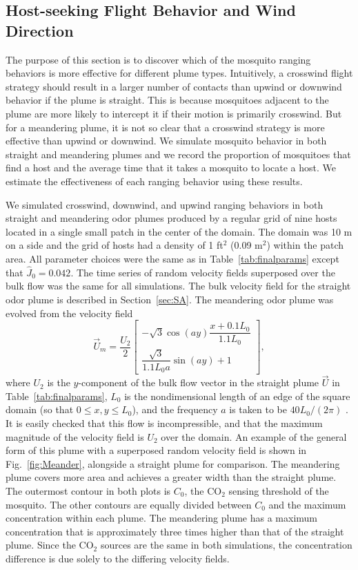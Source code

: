 \documentclass[12pt]{article}
\begin{document}
		\subsection{Host-seeking Flight Behavior and Wind Direction}\label{sec:res:meander}
			The purpose of this section is to discover which of the mosquito ranging behaviors is more effective for different plume types. Intuitively, a crosswind flight strategy should result in a larger number of contacts than upwind or downwind behavior if the plume is straight. This is because mosquitoes adjacent to the plume are more likely to intercept it if their motion is primarily crosswind. But for a meandering plume, it is not so clear that a crosswind strategy is more effective than upwind or downwind. We simulate mosquito behavior in both straight and meandering plumes and we record the proportion of mosquitoes that find a host and the average time that it takes a mosquito to locate a host. We estimate the effectiveness of each ranging behavior using these results.
			
			
			We simulated crosswind, downwind, and upwind ranging behaviors in both straight and meandering odor plumes produced by a regular grid of nine hosts located in a single small patch in the center of the domain. The domain was 10 m on a side and the grid of hosts had a density of 1 ft$^2$ (0.09 m$^2$) within the patch area.  All parameter choices were the same as in Table~\ref{tab:finalparams} except that $\hat{J}_0 = 0.042$. The time series of random velocity fields superposed over the bulk flow was the same for all simulations. The bulk velocity field for the straight odor plume is described in Section~\ref{sec:SA}. The meandering odor plume was evolved from the velocity field
			\begin{equation*}
				\vec{U}_m = \frac{U_2}{2}\begin{bmatrix} -\sqrt{3}\cos(ay)\dfrac{x+0.1L_0}{1.1L_0} \\
				 \dfrac{\sqrt{3}}{1.1L_0 a}\sin(ay)+1\end{bmatrix},
			\end{equation*}
			where $U_2$ is the $y$-component of the bulk flow vector in the straight plume $\vec{U}$ in Table~\ref{tab:finalparams}, $L_0$ is the nondimensional length of an edge of the square domain (so that $0\leq x,y \leq L_0$), and the frequency $a$ is taken to be $40L_0/(2\pi)$ . It is easily checked that this flow is incompressible, and that the maximum magnitude of the velocity field is $U_2$ over the domain. An example of the general form of this plume with a superposed random velocity field is shown in Fig.~\ref{fig:Meander}, alongside a straight plume for comparison. The meandering plume covers more area and achieves a greater width than the straight plume. The outermost contour in both plots is $C_0$, the CO$_2$ sensing threshold of the mosquito. The other contours are equally divided between $C_0$ and the maximum concentration within each plume. The meandering plume has a maximum concentration that is approximately three times higher than that of the straight plume. Since the CO$_2$ sources are the same in both simulations, the concentration difference is due solely to the differing velocity fields.
\end{document}
